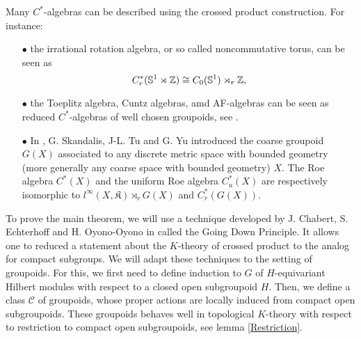 Many $C^*$-algebras can be described using the crossed product construction. For instance:
\begin{itemize}
\item[$\bullet$] the irrational rotation algebra, or so called noncommutative torus, can be seen as 
\[C^*_r(\mathbb S^1 \rtimes \mathbb Z)\cong C_0(\mathbb S^1)\rtimes_r \mathbb Z ,\]
\item[$\bullet$] the Toeplitz algebra, Cuntz algebras, amd AF-algebras can be seen as reduced $C^*$-algebras of well chosen groupoids, see \cite{RenaultDynamical}.
\item[$\bullet$] In \cite{SkTuYu}, G. Skandalis, J-L. Tu and G. Yu introduced the coarse groupoid $G(X)$ associated to any discrete metric space with bounded geometry (more generally any coarse space with bounded geometry) $X$. The Roe algebra $C^*(X)$ and the uniform Roe algebra $C_u^*(X)$ are respectively isomorphic to $l^\infty (X,\mathfrak K)\rtimes_r G(X)$ and $C_r^*(G(X))$. 
\end{itemize}

To prove the main theorem, we will use a technique developed by J. Chabert, S. Echterhoff and H. Oyono-Oyono in \cite{ChabertEOY} called the Going Down Principle. It allows one to reduced a statement about the $K$-theory of crossed product to the analog for compact subgroups. We will adapt these techniques to the setting of groupoids. For this, we first need to define induction to $G$ of $H$-equivariant Hilbert modules with respect to a closed open subgroupoid $H$. Then, we define a class $\mathcal C$ of groupoids, whose proper actions are locally induced from compact open subgroupoids. These groupoids behaves well in topological $K$-theory with respect to restriction to compact open subgroupoids, see lemma \ref{Restriction}.
